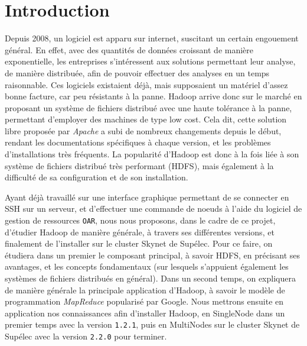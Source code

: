 \section{Introduction}

\par Depuis 2008, un logiciel est apparu sur internet, suscitant un certain engouement général. En effet, avec des quantités de données croissant de manière exponentielle, les entreprises s'intéressent aux solutions permettant leur analyse, de manière distribuée, afin de pouvoir effectuer des analyses en un temps raisonnable. Ces logiciels existaient déjà, mais supposaient un matériel d'assez bonne facture, car peu résistants à la panne. Hadoop arrive donc sur le marché en proposant un système de fichiers distribué avec une haute tolérance à la panne, permettant d'employer des machines de type \og low cost\fg{}. Cela dit, cette solution libre proposée par \emph{Apache} a subi de nombreux changements depuis le début, rendant les documentations spécifiques à chaque version, et les problèmes d'installations très fréquents. La popularité d'Hadoop est donc à la fois liée à son système de fichiers distribué très performant (HDFS), mais également à la difficulté de sa configuration et de son installation.
\par Ayant déjà travaillé sur une interface graphique permettant de se connecter en SSH sur un serveur, et d'effectuer une commande de noeuds à l'aide du logiciel de gestion de ressources \texttt{OAR}, nous nous proposons, dans le cadre de ce projet, d'étudier Hadoop de manière générale, à travers ses différentes versions, et finalement de l'installer sur le cluster Skynet de Supélec. Pour ce faire, on étudiera dans un premier le composant principal, à savoir HDFS, en précisant ses avantages, et les concepts fondamentaux (sur lesquels s'appuient également les systèmes de fichiers distribués en général). Dans un second temps, on expliquera de manière générale la principale application d'Hadoop, à savoir le modèle de programmation \emph{MapReduce} popularisé par Google. Nous mettrons ensuite en application nos connaissances afin d'installer Hadoop, en SingleNode dans un premier temps avec la version \texttt{1.2.1}, puis en MultiNodes sur le cluster Skynet de Supélec avec la version \texttt{2.2.0} pour terminer.

